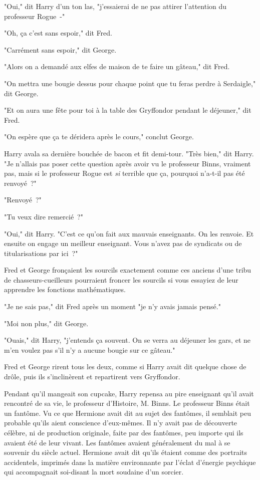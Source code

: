"Oui," dit Harry d'un ton las, "j'essaierai de ne pas attirer l'attention du professeur Rogue~-"

"Oh, ça c'est sans espoir," dit Fred.

"Carrément sans espoir," dit George.

"Alors on a demandé aux elfes de maison de te faire un gâteau," dit Fred.

"On mettra une bougie dessus pour chaque point que tu feras perdre à Serdaigle," dit George.

"Et on aura une fête pour toi à la table des Gryffondor pendant le déjeuner," dit Fred.

"On espère que ça te déridera après le cours," conclut George.

Harry avala sa dernière bouchée de bacon et fit demi-tour. "Très bien," dit Harry. "Je n'allais pas poser cette question après avoir vu le professeur Binns, vraiment pas, mais si le professeur Rogue est \emph{si} terrible que ça, pourquoi n'a-t-il pas été renvoyé~?"

"Renvoyé~?"

"Tu veux dire remercié~?"

"Oui," dit Harry. "C'est ce qu'on fait aux mauvais enseignants. On les renvoie. Et ensuite on engage un meilleur enseignant. Vous n'avez pas de syndicats ou de titularisations par ici~?"

Fred et George fronçaient les sourcils exactement comme ces anciens d'une tribu de chasseurs-cueilleurs pourraient froncer les sourcils si vous essayiez de leur apprendre les fonctions mathématiques.

"Je ne sais pas," dit Fred après un moment "je n'y avais jamais pensé."

"Moi non plus," dit George.

"Ouais," dit Harry, "j'entends ça souvent. On se verra au déjeuner les gars, et ne m'en voulez pas s'il n'y a aucune bougie sur ce gâteau."

Fred et George rirent tous les deux, comme si Harry avait dit quelque chose de drôle, puis ils s'inclinèrent et repartirent vers Gryffondor.

Pendant qu'il mangeait son cupcake, Harry repensa au pire enseignant qu'il avait rencontré de sa vie, le professeur d'Histoire, M. Binns. Le professeur Binns était un fantôme. Vu ce que Hermione avait dit au sujet des fantômes, il semblait peu probable qu'ils aient conscience d'eux-mêmes. Il n'y avait pas de découverte célèbre, ni de production originale, faite par des fantômes, peu importe qui ils avaient été de leur vivant. Les fantômes avaient généralement du mal à se souvenir du siècle actuel. Hermione avait dit qu'ils étaient comme des portraits accidentels, imprimés dans la matière environnante par l'éclat d'énergie psychique qui accompagnait soi-disant la mort soudaine d'un sorcier.

